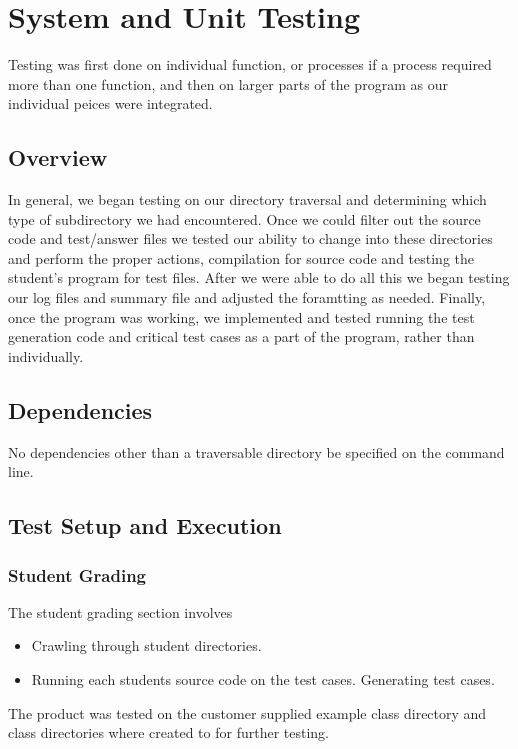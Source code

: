
\chapter{System and Unit Testing}

Testing was first done on individual function, or processes if a process required more than one function, and then on larger parts of the program as our individual peices were integrated. 

\section{Overview}
In general, we began testing on our directory traversal and determining which type of subdirectory we had encountered. Once we could filter out the source code and test/answer files we tested our ability to change into these directories and perform the proper actions, compilation for source code and testing the student's program for test files. After we were able to do all this we began testing our log files and summary file and adjusted the foramtting as needed. Finally, once the program was working, we implemented and tested running the test generation code and critical test cases as a part of the program, rather than individually. 


\section{Dependencies}
No dependencies other than a traversable directory be specified on the command line.  


\section{Test Setup and Execution}
\subsection{Student Grading}
The student grading section involves
\begin{itemize}
\item Crawling through student directories.
\item Running each students source code on the test cases.
\itme Generating test cases.
\end{itemize}
The product was tested on the customer supplied example class directory and class directories where created to for further testing.

